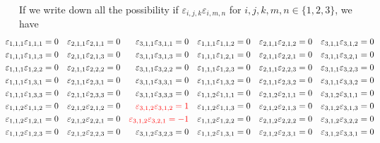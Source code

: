 \documentclass[12pt]{article}
\begin{document}
\newpage
If we write down all the possibility if $\varepsilon_{i,j,k}\varepsilon_{i,m,n}$ for $i,j,k,m,n\in\{1,2,3\}$, we have
\begin{equation}\hspace{-1cm}
\begin{aligned}
&&\varepsilon_{1,1,1}\varepsilon_{1,1,1}=0&&\varepsilon_{2,1,1}\varepsilon_{2,1,1}=0&&\varepsilon_{3,1,1}\varepsilon_{3,1,1}=0&&\varepsilon_{1,1,1}\varepsilon_{1,1,2}=0&&\varepsilon_{2,1,1}\varepsilon_{2,1,2}=0&&\varepsilon_{3,1,1}\varepsilon_{3,1,2}=0\\
&&\varepsilon_{1,1,1}\varepsilon_{1,1,3}=0&&\varepsilon_{2,1,1}\varepsilon_{2,1,3}=0&&\varepsilon_{3,1,1}\varepsilon_{3,1,3}=0&&\varepsilon_{1,1,1}\varepsilon_{1,2,1}=0&&\varepsilon_{2,1,1}\varepsilon_{2,2,1}=0&&\varepsilon_{3,1,1}\varepsilon_{3,2,1}=0\\
&&\varepsilon_{1,1,1}\varepsilon_{1,2,2}=0&&\varepsilon_{2,1,1}\varepsilon_{2,2,2}=0&&\varepsilon_{3,1,1}\varepsilon_{3,2,2}=0&&\varepsilon_{1,1,1}\varepsilon_{1,2,3}=0&&\varepsilon_{2,1,1}\varepsilon_{2,2,3}=0&&\varepsilon_{3,1,1}\varepsilon_{3,2,3}=0\\
&&\varepsilon_{1,1,1}\varepsilon_{1,3,1}=0&&\varepsilon_{2,1,1}\varepsilon_{2,3,1}=0&&\varepsilon_{3,1,1}\varepsilon_{3,3,1}=0&&\varepsilon_{1,1,1}\varepsilon_{1,3,2}=0&&\varepsilon_{2,1,1}\varepsilon_{2,3,2}=0&&\varepsilon_{3,1,1}\varepsilon_{3,3,2}=0\\
&&\varepsilon_{1,1,1}\varepsilon_{1,3,3}=0&&\varepsilon_{2,1,1}\varepsilon_{2,3,3}=0&&\varepsilon_{3,1,1}\varepsilon_{3,3,3}=0&&\varepsilon_{1,1,2}\varepsilon_{1,1,1}=0&&\varepsilon_{2,1,2}\varepsilon_{2,1,1}=0&&\varepsilon_{3,1,2}\varepsilon_{3,1,1}=0\\
&&\varepsilon_{1,1,2}\varepsilon_{1,1,2}=0&&\varepsilon_{2,1,2}\varepsilon_{2,1,2}=0&&{\color{red}\varepsilon_{3,1,2}\varepsilon_{3,1,2}=1}
&&\varepsilon_{1,1,2}\varepsilon_{1,1,3}=0&&\varepsilon_{2,1,2}\varepsilon_{2,1,3}=0&&\varepsilon_{3,1,2}\varepsilon_{3,1,3}=0\\
&&\varepsilon_{1,1,2}\varepsilon_{1,2,1}=0&&\varepsilon_{2,1,2}\varepsilon_{2,2,1}=0&&{\color{red}\varepsilon_{3,1,2}\varepsilon_{3,2,1}=-1}
&&\varepsilon_{1,1,2}\varepsilon_{1,2,2}=0&&\varepsilon_{2,1,2}\varepsilon_{2,2,2}=0&&\varepsilon_{3,1,2}\varepsilon_{3,2,2}=0\\
&&\varepsilon_{1,1,2}\varepsilon_{1,2,3}=0&&\varepsilon_{2,1,2}\varepsilon_{2,2,3}=0&&\varepsilon_{3,1,2}\varepsilon_{3,2,3}=0&&\varepsilon_{1,1,2}\varepsilon_{1,3,1}=0&&\varepsilon_{2,1,2}\varepsilon_{2,3,1}=0&&\varepsilon_{3,1,2}\varepsilon_{3,3,1}=0\\

\end{aligned}
\end{equation}
\end{document}

